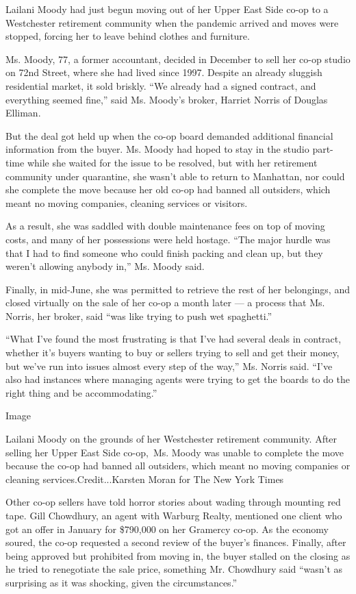 Lailani Moody had just begun moving out of her Upper East Side co-op to
a Westchester retirement community when the pandemic arrived and moves
were stopped, forcing her to leave behind clothes and furniture.

Ms. Moody, 77, a former accountant, decided in December to sell her
co-op studio on 72nd Street, where she had lived since 1997. Despite an
already sluggish residential market, it sold briskly. ``We already had a
signed contract, and everything seemed fine,'' said Ms. Moody's broker,
Harriet Norris of Douglas Elliman.

But the deal got held up when the co-op board demanded additional
financial information from the buyer. Ms. Moody had hoped to stay in the
studio part-time while she waited for the issue to be resolved, but with
her retirement community under quarantine, she wasn't able to return to
Manhattan, nor could she complete the move because her old co-op had
banned all outsiders, which meant no moving companies, cleaning services
or visitors.

As a result, she was saddled with double maintenance fees on top of
moving costs, and many of her possessions were held hostage. ``The major
hurdle was that I had to find someone who could finish packing and clean
up, but they weren't allowing anybody in,'' Ms. Moody said.

Finally, in mid-June, she was permitted to retrieve the rest of her
belongings, and closed virtually on the sale of her co-op a month later
--- a process that Ms. Norris, her broker, said ``was like trying to
push wet spaghetti.''

``What I've found the most frustrating is that I've had several deals in
contract, whether it's buyers wanting to buy or sellers trying to sell
and get their money, but we've run into issues almost every step of the
way,'' Ms. Norris said. ``I've also had instances where managing agents
were trying to get the boards to do the right thing and be
accommodating.''

Image

Lailani Moody on the grounds of her Westchester retirement community.
After selling her Upper East Side co-op,~Ms. Moody was unable to
complete the move because the co-op had banned all outsiders, which
meant no moving companies or cleaning services.Credit...Karsten Moran
for The New York Times

Other co-op sellers have told horror stories about wading through
mounting red tape. Gill Chowdhury, an agent with Warburg Realty,
mentioned one client who got an offer in January for \$790,000 on her
Gramercy co-op. As the economy soured, the co-op requested a second
review of the buyer's finances. Finally, after being approved but
prohibited from moving in, the buyer stalled on the closing as he tried
to renegotiate the sale price, something Mr. Chowdhury said ``wasn't as
surprising as it was shocking, given the circumstances.''

